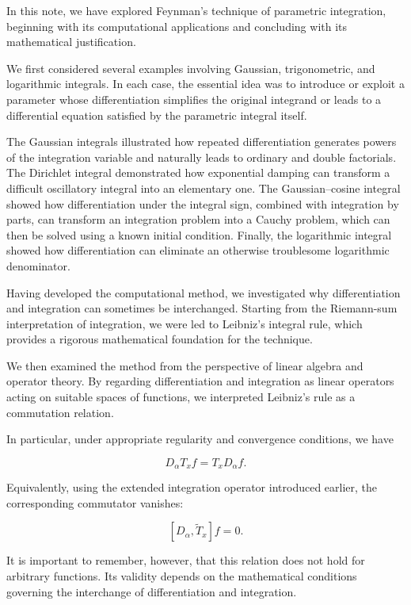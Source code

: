 \documentclass[11pt,a4paper]{article}
\theoremstyle{definition}
\theoremstyle{remark}
\begin{document}
In this note, we have explored Feynman's
technique of parametric integration,
beginning with its computational applications
and concluding with its mathematical
justification.

We first considered several examples
involving Gaussian, trigonometric, and
logarithmic integrals. In each case,
the essential idea was to introduce
or exploit a parameter whose
differentiation simplifies the
original integrand or leads to
a differential equation satisfied
by the parametric integral itself.

The Gaussian integrals illustrated
how repeated differentiation
generates powers of the integration
variable and naturally leads to
ordinary and double factorials.
The Dirichlet integral demonstrated
how exponential damping can
transform a difficult oscillatory
integral into an elementary one.
The Gaussian--cosine integral showed
how differentiation under the integral
sign, combined with integration by parts,
can transform an integration problem
into a Cauchy problem, which can then
be solved using a known initial condition.
Finally, the logarithmic integral
showed how differentiation can
eliminate an otherwise troublesome
logarithmic denominator.

Having developed the computational
method, we investigated why
differentiation and integration
can sometimes be interchanged.
Starting from the Riemann-sum
interpretation of integration,
we were led to Leibniz's
integral rule, which provides
a rigorous mathematical
foundation for the technique.

We then examined the method
from the perspective of
linear algebra and operator
theory. By regarding
differentiation and integration
as linear operators acting
on suitable spaces of functions,
we interpreted Leibniz's rule
as a commutation relation.

In particular, under appropriate
regularity and convergence
conditions, we have

\begin{equation}
    D_\alpha T_x f
    =
    T_x D_\alpha f.
\end{equation}

Equivalently, using the
extended integration operator
introduced earlier, the
corresponding commutator
vanishes:

\begin{equation}
    \boxed{
    [D_\alpha,\widetilde{T}_x]f=0.
    }
\end{equation}

It is important to remember,
however, that this relation
does not hold for arbitrary
functions. Its validity
depends on the mathematical
conditions governing the
interchange of differentiation
and integration.
\end{document}
